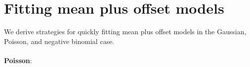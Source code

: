 \documentclass[12pt]{article}
\begin{document}
 



\section{Fitting mean plus offset models}

We derive strategies for quickly fitting mean plus offset models in the Gaussian, Poisson, and negative binomial case.
\\ \\
\textbf{Poisson}:
\end{document}
